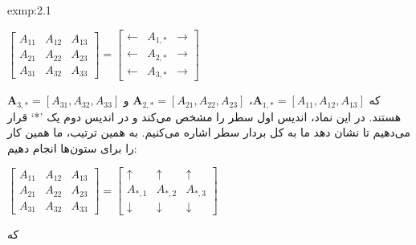 {\begin{spacing}{1.5}
\begin{exmp}{exmp:2.1}
            \begin{center}
                $\begin{bmatrix}
                     A_{11} & A_{12} & A_{13} \\
                     A_{21} & A_{22} & A_{23} \\
                     A_{31} & A_{32} & A_{33}
                \end{bmatrix}=\begin{bmatrix}
                                  \leftarrow & A_{1,*} & \rightarrow \\
                                  \leftarrow & A_{2,*} & \rightarrow \\
                                  \leftarrow & A_{3,*} & \rightarrow
                \end{bmatrix}$
            \end{center}

            که $\textbf{A}_{1,*}=[A_{11},A_{12},A_{13}]$، $\textbf{A}_{2,*}=[A_{21},A_{22},A_{23}]$ و $\textbf{A}_{3,*}=[A_{31},A_{32},A_{33}]$ هستند.
            در این نماد، اندیس اول سطر را مشخص می‌کند و در اندیس دوم یک ’*‘ قرار می‌دهیم تا نشان دهد ما به کل بردار سطر اشاره می‌کنیم. به همین ترتیب، ما همین کار را برای ستون‌ها انجام دهیم:

            \begin{center}
                $\begin{bmatrix}
                     A_{11} & A_{12} & A_{13} \\
                     A_{21} & A_{22} & A_{23} \\
                     A_{31} & A_{32} & A_{33}
                \end{bmatrix}=\begin{bmatrix}
                                  \uparrow   & \uparrow   & \uparrow   \\
                                  A_{*,1}    & A_{*,2}    & A_{*,3}    \\
                                  \downarrow & \downarrow & \downarrow
                \end{bmatrix}$
            \end{center}

            که


\end{exmp}
\end{spacing}}
